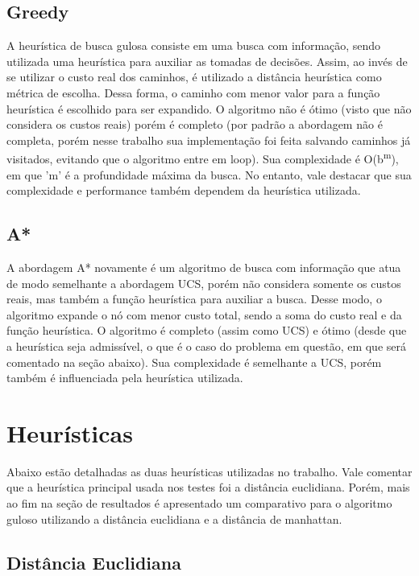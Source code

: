 \documentclass[10pt]{extarticle} %
\begin{document}
\subsection{Greedy}

A heurística de busca gulosa consiste em uma busca com informação, sendo utilizada uma heurística para auxiliar as tomadas de decisões. Assim, ao invés de se utilizar o custo real dos caminhos, é utilizado a distância heurística como métrica de escolha. Dessa forma, o caminho com menor valor para a função heurística é escolhido para ser expandido. O algoritmo não é ótimo (visto que não considera os custos reais) porém é completo (por padrão a abordagem não é completa, porém nesse trabalho sua implementação foi feita salvando caminhos já visitados, evitando que o algoritmo entre em loop). Sua complexidade é O(b\textsuperscript{m}), em que 'm' é a profundidade máxima da busca. No entanto, vale destacar que sua complexidade e performance também dependem da heurística utilizada.

\subsection{A*}

A abordagem A* novamente é um algoritmo de busca com informação que atua de modo semelhante a abordagem UCS, porém não considera somente os custos reais, mas também a função heurística para auxiliar a busca. Desse modo, o algoritmo expande o nó com menor custo total, sendo a soma do custo real e da função heurística. O algoritmo é completo (assim como UCS) e ótimo (desde que a heurística seja admissível, o que é o caso do problema em questão, em que será comentado na seção abaixo). Sua complexidade é semelhante a UCS, porém também é influenciada pela heurística utilizada.

\section{Heurísticas}

Abaixo estão detalhadas as duas heurísticas utilizadas no trabalho. Vale comentar que a heurística principal usada nos testes foi a distância euclidiana. Porém, mais ao fim na seção de resultados é apresentado um comparativo para o algoritmo guloso utilizando a distância euclidiana e a distância de manhattan.  

\subsection{Distância Euclidiana}
\end{document}
